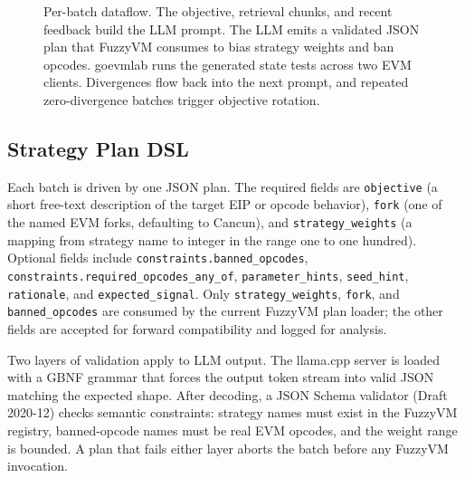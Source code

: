 \documentclass[conference]{IEEEtran}
\begin{document}
\begin{figure}[t]
\caption{Per-batch dataflow. The objective, retrieval chunks, and recent feedback build the LLM prompt. The LLM emits a validated JSON plan that FuzzyVM consumes to bias strategy weights and ban opcodes. goevmlab runs the generated state tests across two EVM clients. Divergences flow back into the next prompt, and repeated zero-divergence batches trigger objective rotation.}
\label{fig:arch}
\end{figure}

\subsection{Strategy Plan DSL}

Each batch is driven by one JSON plan. The required fields are \texttt{objective} (a short free-text description of the target EIP or opcode behavior), \texttt{fork} (one of the named EVM forks, defaulting to Cancun), and \texttt{strategy\_weights} (a mapping from strategy name to integer in the range one to one hundred). Optional fields include \texttt{constraints.banned\_opcodes}, \texttt{constraints.required\_opcodes\_any\_of}, \texttt{parameter\_hints}, \texttt{seed\_hint}, \texttt{rationale}, and \texttt{expected\_signal}. Only \texttt{strategy\_weights}, \texttt{fork}, and \texttt{banned\_opcodes} are consumed by the current FuzzyVM plan loader; the other fields are accepted for forward compatibility and logged for analysis.

Two layers of validation apply to LLM output. The llama.cpp server is loaded with a GBNF grammar that forces the output token stream into valid JSON matching the expected shape. After decoding, a JSON Schema validator (Draft 2020-12) checks semantic constraints: strategy names must exist in the FuzzyVM registry, banned-opcode names must be real EVM opcodes, and the weight range is bounded. A plan that fails either layer aborts the batch before any FuzzyVM invocation.
\end{document}
